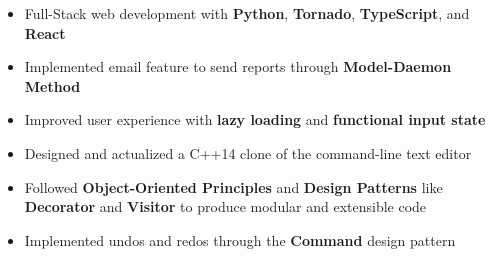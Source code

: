 \documentclass[10pt,a4paper,ragged2e]{altacv}
\begin{document}

\begin{fullwidth}
    \makecvheader
\end{fullwidth}



\begin{itemize}
    \item Full-Stack web development with \textbf{Python}, \textbf{Tornado}, \textbf{TypeScript}, and \textbf{React}
    \item Implemented email feature to send reports through \textbf{Model-Daemon Method}
    \item Improved user experience with \textbf{lazy loading} and \textbf{functional input state}
\end{itemize}



\begin{itemize}
    \item Designed and actualized a C++14 clone of the command-line text editor
    \item Followed \textbf{Object-Oriented Principles} and \textbf{Design Patterns} like \textbf{Decorator} and \textbf{Visitor} to produce modular and extensible code
    \item Implemented undos and redos through the \textbf{Command} design pattern
\end{itemize}
\end{document}
